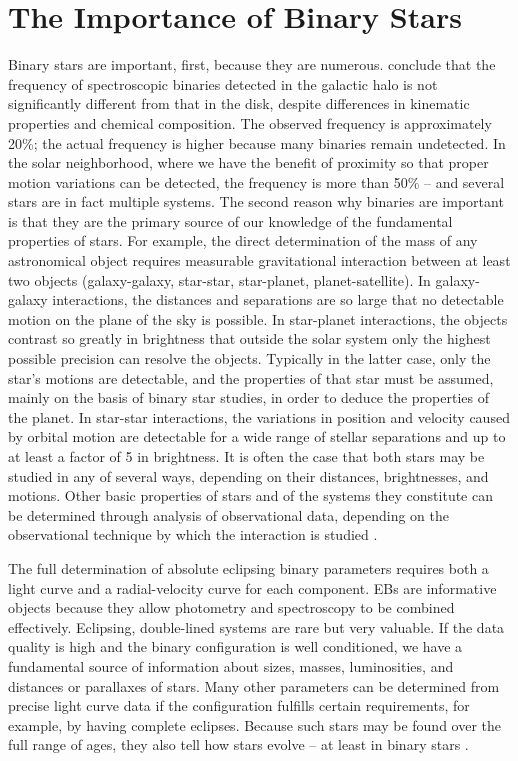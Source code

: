 \section{The Importance of Binary Stars}
Binary stars are important, first, because they are numerous. \cite{latham1992} 
conclude that the frequency of spectroscopic binaries detected in the galactic
halo is not significantly different from that in the disk, despite differences in
kinematic properties and chemical composition. The observed frequency is approximately
20\%; the actual frequency is higher because many binaries remain undetected.
In the solar neighborhood, where we have the benefit of proximity so that
proper motion variations can be detected, the frequency is more than 50\% -- and
several stars are in fact multiple systems.
The second reason why binaries are important is that they are the primary source
of our knowledge of the fundamental properties of stars. For example, the direct
determination of the mass of any astronomical object requires measurable gravitational
interaction between at least two objects (galaxy-galaxy, star-star, star-planet,
planet-satellite). In galaxy-galaxy interactions, the distances and separations are
so large that no detectable motion on the plane of the sky is possible. In star-planet
interactions, the objects contrast so greatly in brightness that outside the solar system
only the highest possible precision can resolve the objects. 
Typically in the latter case, only the star's motions are detectable, and the
properties of that star must be assumed, mainly on the basis of binary star studies, in
order to deduce the properties of the planet. In star-star interactions, the variations
in position and velocity caused by orbital motion are detectable for a wide range
of stellar separations and up to at least a factor of 5 in brightness. It is often the
case that both stars may be studied in any of several ways, depending on their distances,
brightnesses, and motions. Other basic properties of stars and of the systems
they constitute can be determined through analysis of observational data, depending
on the observational technique by which the interaction is studied \citep{kallrath2009eclipsing}. 

The full determination of absolute eclipsing binary parameters requires both a
light curve and a radial-velocity curve for each component. EBs are informative
objects because they allow photometry and spectroscopy to be combined effectively.
Eclipsing, double-lined systems are rare but very valuable. If the data quality is high
and the binary configuration is well conditioned, we have a fundamental source of
information about sizes, masses, luminosities, and distances or parallaxes of stars.
Many other parameters can be determined from precise light curve data if the configuration 
fulfills certain requirements, for example, by having complete eclipses.
Because such stars may be found over the full range of ages, they also tell how stars
evolve -- at least in binary stars \citep{kallrath2009eclipsing}.


